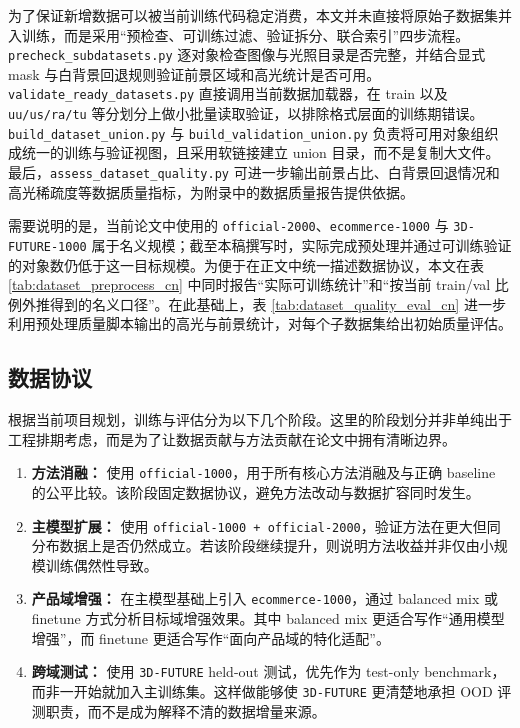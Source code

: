 \documentclass[UTF8,a4paper]{ctexart}
\begin{document}
为了保证新增数据可以被当前训练代码稳定消费，本文并未直接将原始子数据集并入训练，而是采用“预检查、可训练过滤、验证拆分、联合索引”四步流程。\texttt{precheck\_subdatasets.py} 逐对象检查图像与光照目录是否完整，并结合显式 mask 与白背景回退规则验证前景区域和高光统计是否可用。\texttt{validate\_ready\_datasets.py} 直接调用当前数据加载器，在 train 以及 \texttt{uu/us/ra/tu} 等分划分上做小批量读取验证，以排除格式层面的训练期错误。\texttt{build\_dataset\_union.py} 与 \texttt{build\_validation\_union.py} 负责将可用对象组织成统一的训练与验证视图，且采用软链接建立 union 目录，而不是复制大文件。最后，\texttt{assess\_dataset\_quality.py} 可进一步输出前景占比、白背景回退情况和高光稀疏度等数据质量指标，为附录中的数据质量报告提供依据。

需要说明的是，当前论文中使用的 \texttt{official-2000}、\texttt{ecommerce-1000} 与 \texttt{3D-FUTURE-1000} 属于名义规模；截至本稿撰写时，实际完成预处理并通过可训练验证的对象数仍低于这一目标规模。为便于在正文中统一描述数据协议，本文在表 \ref{tab:dataset_preprocess_cn} 中同时报告“实际可训练统计”和“按当前 train/val 比例外推得到的名义口径”。在此基础上，表 \ref{tab:dataset_quality_eval_cn} 进一步利用预处理质量脚本输出的高光与前景统计，对每个子数据集给出初始质量评估。

\subsection{数据协议}

根据当前项目规划，训练与评估分为以下几个阶段。这里的阶段划分并非单纯出于工程排期考虑，而是为了让数据贡献与方法贡献在论文中拥有清晰边界。

\begin{enumerate}
\item \textbf{方法消融：} 使用 \texttt{official-1000}，用于所有核心方法消融及与正确 baseline 的公平比较。该阶段固定数据协议，避免方法改动与数据扩容同时发生。
\item \textbf{主模型扩展：} 使用 \texttt{official-1000 + official-2000}，验证方法在更大但同分布数据上是否仍然成立。若该阶段继续提升，则说明方法收益并非仅由小规模训练偶然性导致。
\item \textbf{产品域增强：} 在主模型基础上引入 \texttt{ecommerce-1000}，通过 balanced mix 或 finetune 方式分析目标域增强效果。其中 balanced mix 更适合写作“通用模型增强”，而 finetune 更适合写作“面向产品域的特化适配”。
\item \textbf{跨域测试：} 使用 \texttt{3D-FUTURE} held-out 测试，优先作为 test-only benchmark，而非一开始就加入主训练集。这样做能够使 \texttt{3D-FUTURE} 更清楚地承担 OOD 评测职责，而不是成为解释不清的数据增量来源。
\end{enumerate}
\end{document}
